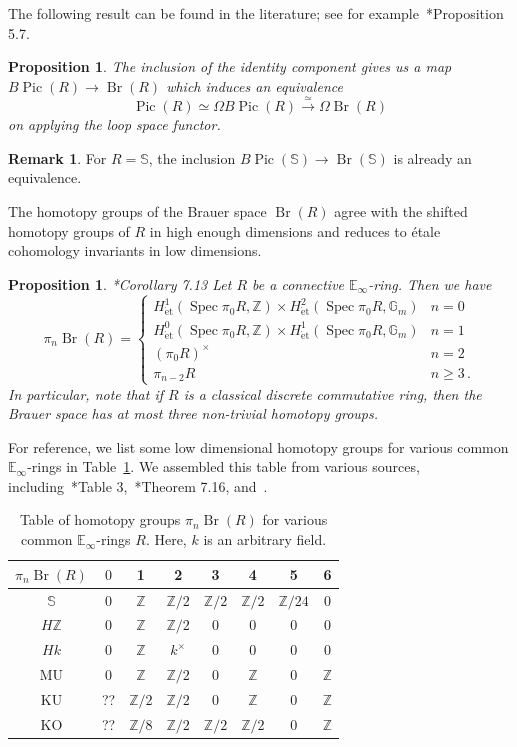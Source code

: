 \documentclass[10pt]{amsart}
\newcommand{\longto}{\longrightarrow}
\theoremstyle{plain}
\newtheorem{proposition}[theorem]{Proposition}
\theoremstyle{definition}
\newtheorem{rmk}[theorem]{Remark}
\DeclareMathOperator{\KO}{KO}
\DeclareMathOperator{\Pic}{Pic}
\DeclareMathOperator{\Br}{Br}
\DeclareMathOperator{\KU}{KU}
\DeclareMathOperator{\MU}{MU}
\DeclareMathOperator{\Spec}{Spec}
\newcommand{\et}{\mathrm{\acute{e}t}}
\newcommand{\bE}{\mathbb{E}}
\newcommand{\bS}{\mathbb{S}}
\newcommand{\bZ}{\mathbb{Z}}
\begin{document}
The following result can be found in the literature; see for example~\cite{GL21}*{Proposition 5.7}.

\begin{proposition}
  The inclusion of the identity component gives us a map $B\Pic(R) \to \Br(R)$ which induces an equivalence
  \[
  \Pic(R) \simeq \Omega B \Pic(R) \overset{\simeq}\longto \Omega \Br(R)
  \]
  on applying the loop space functor.
\end{proposition}

\begin{rmk}
  For $R=\bS$, the inclusion $B\Pic(\bS) \to \Br(\bS)$ is already an equivalence.
\end{rmk}

The homotopy groups of the Brauer space $\Br(R)$ agree with the shifted homotopy groups of $R$ in high enough dimensions and reduces to {\'e}tale cohomology invariants in low dimensions.

\begin{proposition}\cite{AG14}*{Corollary 7.13}
Let $R$ be a connective $\bE_\infty$-ring. Then we have
\[
\pi_{n} \Br(R) = \begin{cases}
H^1_{\et}(\Spec \pi_0 R , \bZ) \times H^2_{\et}(\Spec \pi_0 R, \mathbb{G}_m) & n=0 \\
H^0_{\et}(\Spec \pi_0 R , \bZ) \times H^1_{\et}(\Spec \pi_0 R, \mathbb{G}_m) & n=1 \\
(\pi_0 R)^\times & n=2 \\
\pi_{n-2} R & n \geq 3 \,.
\end{cases}
\]
In particular, note that if $R$ is a classical discrete commutative ring, then the Brauer space has at most three non-trivial homotopy groups.
\end{proposition}

For reference, we list some low dimensional homotopy groups for various common $\bE_\infty$-rings in Table~\ref{table:homotopy}. We assembled this table from various sources, including~\cite{Dou05}*{Table 3},~\cite{AG14}*{Theorem 7.16}, and~\cite{DK70}.

\begin{table}[h!]
\begin{center}
  \begin{tabular}{ c | c c c c c c c}
    $\pi_n \Br(R)$ & $0$ & 1 & 2 & 3 & 4 & 5 & 6 \\
    \hline
    $\bS $ & 0 & $\bZ$ & $\bZ/2$ & $\bZ/2$ & $\bZ/2$ & $\bZ/24$ & 0 \\
    $H\bZ$ & 0 & $\bZ$ & $\bZ/2$ & 0 & 0 & 0 & 0 \\
    $Hk$ & 0 & $\bZ$ & $k^{\times}$ & 0 & 0 & 0 & 0 \\
    $\MU$ & 0 & $\bZ$ & $\bZ/2$ & 0 & $\bZ$ & 0 & $\bZ$ \\
    $\KU$ & ?? & $\bZ/2$ & $\bZ/2$ & 0 & $\bZ$ & 0 & $\bZ$ \\
    $\KO$ & ?? & $\bZ/8$ & $\bZ/2$ & $\bZ/2$ & $\bZ/2$ & 0 & $\bZ$
  \end{tabular}
  \caption{Table of homotopy groups $\pi_n \Br(R)$ for various common $\bE_\infty$-rings $R$. Here, $k$ is an arbitrary field.}
  \label{table:homotopy}
\end{center}
\end{table}
\end{document}
